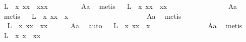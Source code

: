 \begin{isabellebody}
\ L{}{\isacharcolon}\ \ {\isachardoublequoteopen}{\isasymforall}x{\isachardot}\ {\isacharparenleft}{\isasymbox}{\isasymbox}x{\isacharparenright}{\isasymcdot}x\ {\isasymapprox}\ {\isacharparenleft}{\isacharparenleft}{\isasymbox}{\isasymbox}x{\isacharparenright}{\isasymcdot}{\isacharparenleft}{\isasymbox}x{\isacharparenright}{\isacharparenright}{\isasymcdot}x{\isachardoublequoteclose}\ \ \ \ \ \ \ \ \isamarkupfalse%
\ A{}a\ \isamarkupfalse%
\ metis\isanewline
\ \isamarkupfalse%
\ L{}{\isacharcolon}\ \ {\isachardoublequoteopen}{\isasymforall}x{\isachardot}\ {\isacharparenleft}{\isasymbox}{\isasymbox}x{\isacharparenright}{\isasymcdot}x\ {\isasymapprox}\ {\isacharparenleft}{\isasymbox}x{\isacharparenright}{\isasymcdot}x{\isachardoublequoteclose}\ \ \ \ \ \ \ \ \ \ \ \ \ \ \ \ \isamarkupfalse%
\ A{}a\ \isamarkupfalse%
\ metis\isanewline
\ \isamarkupfalse%
\ L{}{\isacharcolon}\ \ {\isachardoublequoteopen}{\isasymforall}x{\isachardot}\ {\isacharparenleft}{\isasymbox}{\isasymbox}x{\isacharparenright}{\isasymcdot}x\ {\isasymapprox}\ x{\isachardoublequoteclose}\ \ \ \ \ \ \ \ \ \ \ \ \ \ \ \ \ \ \ \ \ \isamarkupfalse%
\ A{}a\ \isamarkupfalse%
\ metis\isanewline
\ \isamarkupfalse%
\ \ L{}{\isacharcolon}\ \ {\isachardoublequoteopen}{\isasymforall}x{\isachardot}\ {\isasymbox}{\isacharparenleft}{\isacharparenleft}{\isasymbox}{\isasymbox}x{\isacharparenright}{\isasymcdot}x{\isacharparenright}\ {\isasymapprox}\ {\isasymbox}{\isacharparenleft}{\isacharparenleft}{\isasymbox}{\isasymbox}x{\isacharparenright}{\isasymcdot}{\isacharparenleft}{\isasymbox}x{\isacharparenright}{\isacharparenright}{\isachardoublequoteclose}\ \ \ \ \ \isamarkupfalse%
\ A{}a\ \isamarkupfalse%
\ auto\isanewline
\ \isamarkupfalse%
\ L{}{\isacharcolon}\ \ {\isachardoublequoteopen}{\isasymforall}x\ {\isachardot}{\isasymbox}{\isacharparenleft}{\isacharparenleft}{\isasymbox}{\isasymbox}x{\isacharparenright}{\isasymcdot}x{\isacharparenright}\ {\isasymapprox}\ {\isasymbox}{\isasymbox}x{\isachardoublequoteclose}\ \ \ \ \ \ \ \ \ \ \ \ \ \ \ \isamarkupfalse%
\ A{}a\ \isamarkupfalse%
\ metis\isanewline
\ \isamarkupfalse%
\ L{}{\isacharcolon}\ \ {\isachardoublequoteopen}{\isasymforall}x{\isachardot}\ {\isasymbox}{\isasymbox}{\isacharparenleft}x{\isasymbox}{\isacharparenright}\ {\isasymapprox}\ {\isasymbox}{\isacharparenleft}{\isasymbox}{\isasymbox}{\isacharparenleft}x{\isasymbox}{\isacharparenright}{\isacharparenright}{\isasymcdot}{\isacharparenleft}x{\isasymbox}{\isacharparenright}{\isachardoublequoteclose}\ \ \ \ \ \ \ \isamarkupfalse%

\end{isabellebody}
